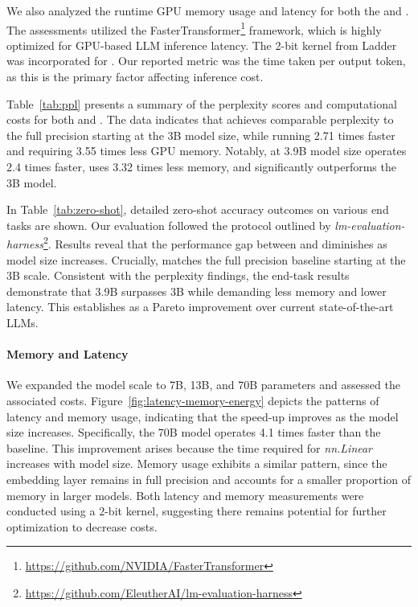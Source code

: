 We also analyzed the runtime GPU memory usage and latency for both the  and . The assessments utilized the FasterTransformer\footnote{\url{https://github.com/NVIDIA/FasterTransformer}} framework, which is highly optimized for GPU-based LLM inference latency. The 2-bit kernel from Ladder~\cite{ladder} was incorporated for . Our reported metric was the time taken per output token, as this is the primary factor affecting inference cost.

Table~\ref{tab:ppl} presents a summary of the perplexity scores and computational costs for both  and . The data indicates that  achieves comparable perplexity to the full precision  starting at the 3B model size, while running 2.71 times faster and requiring 3.55 times less GPU memory. Notably,  at 3.9B model size operates 2.4 times faster, uses 3.32 times less memory, and significantly outperforms the  3B model.

In Table~\ref{tab:zero-shot}, detailed zero-shot accuracy outcomes on various end tasks are shown. Our evaluation followed the protocol outlined by \emph{lm-evaluation-harness}\footnote{\url{https://github.com/EleutherAI/lm-evaluation-harness}}. Results reveal that the performance gap between  and  diminishes as model size increases. Crucially,  matches the full precision baseline starting at the 3B scale. Consistent with the perplexity findings, the end-task results demonstrate that  3.9B surpasses  3B while demanding less memory and lower latency. This establishes  as a Pareto improvement over current state-of-the-art LLMs.

\paragraph{Memory and Latency}

We expanded the model scale to 7B, 13B, and 70B parameters and assessed the associated costs. Figure~\ref{fig:latency-memory-energy} depicts the patterns of latency and memory usage, indicating that the speed-up improves as the model size increases. Specifically, the  70B model operates 4.1 times faster than the  baseline. This improvement arises because the time required for \emph{nn.Linear} increases with model size. Memory usage exhibits a similar pattern, since the embedding layer remains in full precision and accounts for a smaller proportion of memory in larger models. Both latency and memory measurements were conducted using a 2-bit kernel, suggesting there remains potential for further optimization to decrease costs.

